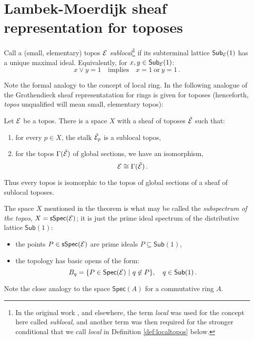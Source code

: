 \documentclass[lambek.tex]{subfiles}
\begin{document}
\section{Lambek-Moerdijk sheaf representation for toposes}

\begin{definition} Call a  (small, elementary)  topos $\mathcal{E}$  \emph{sublocal}\footnote{
In the original work \cite{LM}, and elsewhere, the term \emph{local} was used for the concept here called \emph{sublocal}, and another term was then required for the stronger conditional that we call \emph{local} in Definition \ref{def:localtopos} below.
} 
if its subterminal lattice $\mathsf{Sub}_{\mathcal{E}}(1)$ has a unique maximal ideal.
Equivalently, for $x,y\in \mathsf{Sub}_{\mathcal{E}}(1)$: 
\[
x\vee y = 1\quad\text{implies}\quad x=1\ \text{or}\ y=1\,.
\]
\end{definition}
%
Note the formal analogy to the concept of local ring.
In \cite{LM} the following analogue of the Grothendieck sheaf representatation for rings is given for toposes (henceforth, \emph{topos} unqualified will mean small, elementary topos):
\begin{theorem}
Let $\mathcal{E}$ be a topos.  There is a space $X$ with a sheaf of toposes $\tilde{\mathcal{E}}$ such that:
\begin{enumerate}
\item for every $p\in X$, the stalk $\tilde{\mathcal{E}}_p$ is a sublocal topos, 
\item for the topos $\Gamma(\tilde{\mathcal{E}})$ of global sections, we have an isomorphism, $$\mathcal{E}\cong \Gamma(\tilde{\mathcal{E}})\,.$$
\end{enumerate}
Thus every topos is isomorphic to the topos of global sections of a sheaf of sublocal toposes.
\end{theorem}


The space $X$ mentioned in the theorem is what may be called the \emph{subspectrum of the topos},  $X=\mathsf{sSpec}(\mathcal{E})$;   
it is just the prime ideal spectrum of the distributive lattice $\mathsf{Sub}(1)$:
\begin{itemize}
\item the points $P\in \mathsf{sSpec}(\mathcal{E})$ are prime ideals $P\subseteq \mathsf{Sub}(1)$,
\item the topology has basic opens of the form:
$$B_q = \{ P\in \mathsf{Spec}(\mathcal{E})\ |\ q\not\in P \}, \quad q\in\mathsf{Sub}(1)\,.$$
\end{itemize}
%
Note the close analogy to the space $\mathsf{Spec}(A)$ for a commutative ring $A$.
\end{document}
